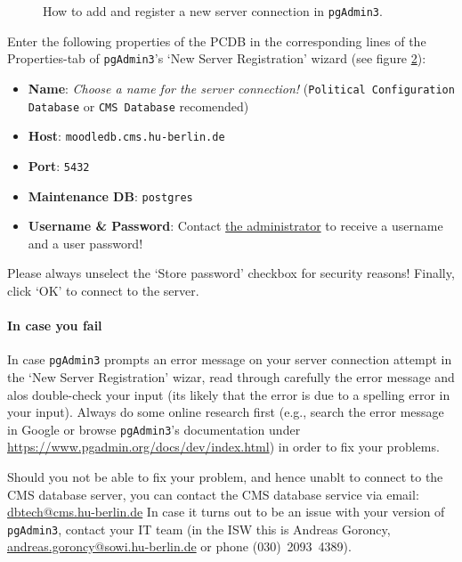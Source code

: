 \begin{figure}[h!]
\begin{subfigure}{.45\textwidth}
    \label{fig_pgadmin3_server_registration}
  \end{subfigure} 
  \caption{How to add and register a new server connection in \texttt{pgAdmin3}.}
\end{figure}

Enter the following properties of the PCDB in the corresponding lines of the Properties-tab of \texttt{pgAdmin3}'s `New Server Registration' wizard (see figure \ref{fig_pgadmin3_server_registration}):\\
\begin{itemize}
\item[]{{\bf Name}: {\em Choose a name for the server connection!} (\texttt{\footnotesize Political Configuration Database} or \texttt{\footnotesize CMS Database} recomended)}
\item[]{{\bf Host}: \texttt{\footnotesize moodledb.cms.hu-berlin.de} }
\item[]{{\bf Port}: \texttt{\footnotesize 5432} }
\item[]{{\bf Maintenance DB}: \texttt{\footnotesize postgres} }
\item[]{{\bf Username \& Password}: Contact \href{mailto:tarik.abou-chadi@hu-berlin.de}{the administrator} to receive a username and a user password! }
\end{itemize}
Please always unselect the `Store password' checkbox for security reasons! Finally, click `OK' to connect to the server.

\paragraph{In case you fail}
In case \texttt{pgAdmin3} prompts an error message on your server connection attempt in the `New Server Registration' wizar, read through carefully the error message and alos double-check your input (its likely that the error is due to a spelling error in your input). 
Always do some online research first (e.g., search the error message in Google or browse \texttt{pgAdmin3}'s documentation under \url{https://www.pgadmin.org/docs/dev/index.html}) in order to fix your problems. 

Should you not be able to fix your problem, and hence unablt to connect to the CMS database server, you can contact the CMS database service via email: \href{mailto:dbtech@cms.hu-berlin.de}{dbtech@cms.hu-berlin.de}
In case it turns out to be an issue with your version of \texttt{pgAdmin3}, contact your IT team (in the ISW this is Andreas Goroncy, \href{mailto:andreas.goroncy@sowi.hu-berlin.de}{andreas.goroncy@sowi.hu-berlin.de} or phone (030)~2093~4389).


